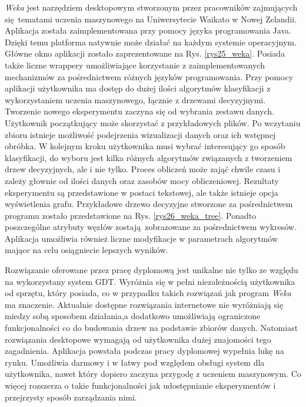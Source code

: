 \textit{Weka} jest narzędziem desktopowym stworzonym przez pracowników zajmujących się tematami uczenia maszynowego na Uniwersytecie Waikato w Nowej Zelandii. Aplikacja została zaimplementowana przy pomocy języka programowania Java. Dzięki temu platforma natywnie może działać na każdym systemie operacyjnym. Główne okno aplikacji zostało zaprezentowane na Rys. \ref{rys25_weka}. Posiada także liczne wrappery umożliwiające korzystanie z zaimplementowanych mechanizmów za pośrednictwem różnych języków programowania. Przy pomocy aplikacji użytkownika ma dostęp do dużej ilości algorytmów klasyfikacji z wykorzystaniem uczenia maszynowego, łącznie z drzewami decyzyjnymi. Tworzenie nowego eksperymentu zaczyna się od wybrania zestawu danych. Użytkownik początkujący może skorzystać z przykładowych plików. Po wczytaniu zbioru istnieje możliwość podejrzenia wizualizacji danych oraz ich wstępnej obróbka. W kolejnym kroku użytkownika musi wybrać interesujący go sposób klasyfikacji, do wyboru jest kilka różnych algorytmów związanych z tworzeniem drzew decyzyjnych, ale i nie tylko. Proces obliczeń może zająć chwile czasu i zależy głownie od ilości danych oraz zasobów mocy obliczeniowej. Rezultaty eksperymentu są przedstawione w postaci tekstowej, ale także istnieje opcja wyświetlenia grafu. Przykładowe drzewo decyzyjne stworzone za pośrednictwem programu zostało przedstawione na Rys. \ref{rys26_weka_tree}. Ponadto poszczególne atrybuty węzłów zostają zobrazowane za pośrednictwem wykresów. Aplikacja umożliwia również liczne modyfikacje w parametrach algorytmów mające na celu osiągniecie lepszych wyników.  

Rozwiązanie oferowane przez pracę dyplomową jest unikalne nie tylko ze względu na wykorzystany system GDT. Wyróżnia się w pełni niezależnością użytkownika od sprzętu, który posiada, co w przypadku takich rozwiązań jak program \textit{Weka} ma znaczenie. Aktualnie dostępne rozwiązania internetowe nie wyróżniają się miedzy sobą sposobem działania,a dodatkowo umożliwiają ograniczone funkcjonalności co do budowania drzew na podstawie zbiorów danych. Natomiast rozwiązania desktopowe wymagają od użytkownika dużej znajomości tego zagadnienia. Aplikacja powstała podczas pracy dyplomowej wypełnia lukę na rynku. Umożliwia darmowy i w łatwy pod względem obsługi system dla użytkownika, nawet który dopiero zaczyna przygodę z uczeniem maszynowym. Co więcej rozszerza o takie funkcjonalności jak udostępnianie eksperymentów i przejrzysty sposób zarządzania nimi. 